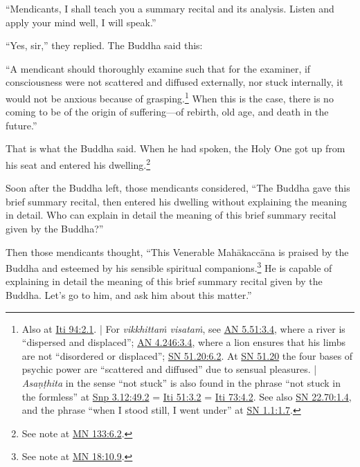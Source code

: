 \documentclass[12pt,openany]{book}%
\begin{document}
“Mendicants, I shall teach you a summary recital and its analysis. Listen and apply your mind well, I will speak.” 

“Yes, sir,” they replied. The Buddha said this: 

“A mendicant should thoroughly examine such that for the examiner, if consciousness were not scattered and diffused externally, nor stuck internally, it would not be anxious because of grasping.\footnote{Also at \href{https://suttacentral.net/iti94/en/sujato\#2.1}{Iti 94:2.1}. | For \textit{\textsanskrit{vikkhittaṁ} \textsanskrit{visataṁ}}, see \href{https://suttacentral.net/an5.51/en/sujato\#3.4}{AN 5.51:3.4}, where a river is “dispersed and displaced”; \href{https://suttacentral.net/an4.246/en/sujato\#3.4}{AN 4.246:3.4}, where a lion ensures that his limbs are not “disordered or displaced”;  \href{https://suttacentral.net/sn51.20/en/sujato\#6.2}{SN 51.20:6.2}. At \href{https://suttacentral.net/sn51.20/en/sujato}{SN 51.20} the four bases of psychic power are “scattered and diffused” due to sensual pleasures. | \textit{\textsanskrit{Asaṇṭhita}} in the sense “not stuck” is also found in the phrase “not stuck in the formless” at \href{https://suttacentral.net/snp3.12/en/sujato\#49.2}{Snp 3.12:49.2} = \href{https://suttacentral.net/iti51/en/sujato\#3.2}{Iti 51:3.2} = \href{https://suttacentral.net/iti73/en/sujato\#4.2}{Iti 73:4.2}. See also \href{https://suttacentral.net/sn22.70/en/sujato\#1.4}{SN 22.70:1.4}, and the phrase “when I stood still, I went under” at \href{https://suttacentral.net/sn1.1/en/sujato\#1.7}{SN 1.1:1.7}. } When this is the case, there is no coming to be of the origin of suffering—of rebirth, old age, and death in the future.” 

That is what the Buddha said. When he had spoken, the Holy One got up from his seat and entered his dwelling.\footnote{See note at \href{https://suttacentral.net/mn133/en/sujato\#6.2}{MN 133:6.2}. } 

Soon after the Buddha left, those mendicants considered, “The Buddha gave this brief summary recital, then entered his dwelling without explaining the meaning in detail. Who can explain in detail the meaning of this brief summary recital given by the Buddha?” 

Then those mendicants thought, “This Venerable \textsanskrit{Mahākaccāna} is praised by the Buddha and esteemed by his sensible spiritual companions.\footnote{See note at \href{https://suttacentral.net/mn18/en/sujato\#10.9}{MN 18:10.9}. } He is capable of explaining in detail the meaning of this brief summary recital given by the Buddha. Let’s go to him, and ask him about this matter.” 
\end{document}
